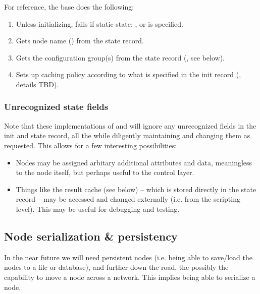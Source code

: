 \documentclass[10pt]{article}
\begin{document}
  For reference, the base  does the following:  

\begin{enumerate}

  \item Unless initializing, fails if static state: , 
    or  is specified.

  \item Gets node name () from the state record.

  \item Gets the configuration group(s) from the state record 
    (, see below).

  \item Sets up caching policy according to what is specified in the init
    record (, details TBD).

\end{enumerate}

\subsubsection{Unrecognized state fields}

  Note that these implementations of  and  will
  ignore any unrecognized fields in the init and state record, all the while 
  diligently maintaining and changing them as requested. This allows for a few
  interesting possibilities:

  \begin{itemize}
  
  \item Nodes may be assigned arbitary additional attributes and data,
    meaningless to the node itself, but perhaps useful to the control layer.

  \item Things like the result cache (see below) -- which is stored directly in
    the state record -- may be accessed and changed externally (i.e. from the
    scripting level). This may be useful for debugging and testing.

  \end{itemize}

\subsection{Node serialization \& persistency}

  In the near future we will need persistent nodes (i.e. being able to
  save/load the nodes to a file or database), and further down the road, the
  possibly the capability to move a node across a network. This implies being
  able to serialize a node.
  
\end{document}
